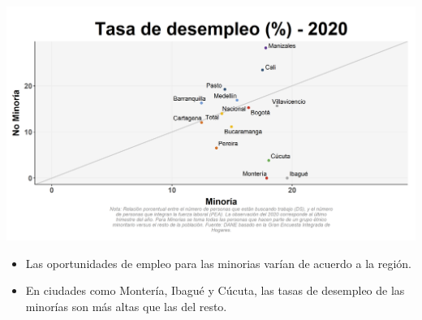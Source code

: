 \documentclass[aspectratio=169]{beamer}
\begin{document}
        \begin{slide}{15} 
            \begin{imagecolumn}
                \includegraphics[width=\columnwidth]{img/var_43_scatter.png}
            \end{imagecolumn}
            \begin{textcolumn}
                \begin{itemize}
                    \item Las oportunidades de empleo para las minorias varían de acuerdo a la región. 
                    \item En ciudades como Montería, Ibagué y Cúcuta, las tasas de desempleo de las minorías son más altas que las del resto.
                \end{itemize}
            \end{textcolumn}
    \printcolumns
    \end{slide}    
    
\end{document}
